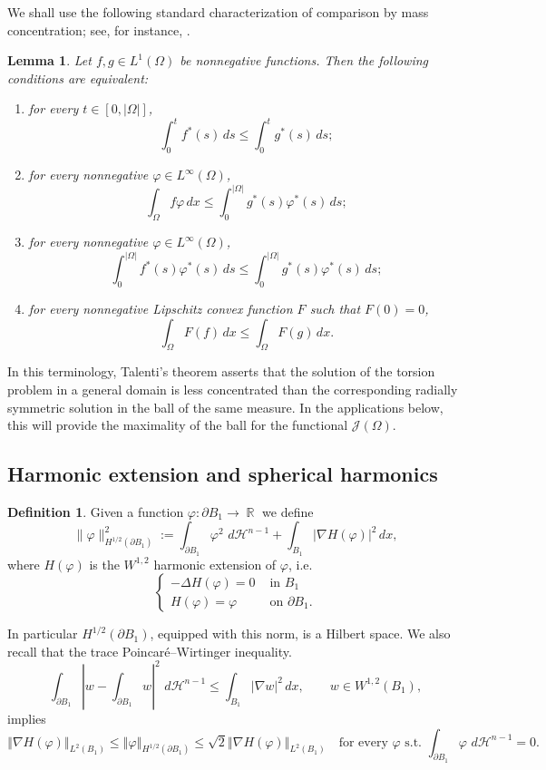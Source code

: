 \documentclass[oneside,a4paper,11pt,notitlepage]{article}
\newcommand{\abs}[1]{{\left|#1\right|}}
\newcommand{\norma}[1]{{\left\Vert#1\right\Vert}}
\newcommand{\dH}{\,d\mathcal{H}^{n-1}}
\theoremstyle{definition}
\newtheorem{definizione}{Definition}[section]
\theoremstyle{plain}
\newtheorem{lemma}[theorem]{Lemma}
\theoremstyle{definition}
\DeclareMathOperator{\R}{\mathbb{R}}
\begin{document}
We shall use the following standard characterization of comparison by mass concentration; see, for instance, \cite{ALT}.

\begin{lemma}
Let $f,g\in L^1(\Omega)$ be nonnegative functions. Then the following conditions are equivalent:
\begin{enumerate}
    \item for every $t\in[0,\abs{\Omega}]$,
    \[
        \int_0^t f^\ast(s)\,ds\leq\int_0^t g^\ast(s)\,ds;
    \]
    
    \item for every nonnegative $\varphi\in L^\infty(\Omega)$,
    \[
        \int_\Omega f\varphi\,dx\leq\int_0^{\abs{\Omega}} g^\ast(s)\varphi^\ast(s)\,ds;
    \]
    
    \item for every nonnegative $\varphi\in L^\infty(\Omega)$,
    \[
        \int_0^{\abs{\Omega}} f^\ast(s)\varphi^\ast(s)\,ds\leq\int_0^{\abs{\Omega}} g^\ast(s)\varphi^\ast(s)\,ds;
    \]
    
    \item for every nonnegative Lipschitz convex function $F$ such that $F(0)=0$,
    \[
        \int_\Omega F(f)\,dx\leq\int_\Omega F(g)\,dx.
    \]
\end{enumerate}
\end{lemma}
In this terminology, Talenti's theorem asserts that the solution of the torsion problem in a general domain is less concentrated than the corresponding radially symmetric solution in the ball of the same measure. In the applications below, this will provide the maximality of the ball for the functional $\mathcal{J}(\Omega)$.
\subsection{Harmonic extension and spherical harmonics}
\begin{definizione}
Given a function $\varphi:\partial B_1\to \R$ we define
\[
\|\varphi\|_{H^{1/2}(\partial B_1)}^2:=\int_{\partial B_1} \varphi^2 \,\dH+\int_{B_1} |\nabla H(\varphi)|^2\,dx,
\]
where $H(\varphi)$ is the $W^{1,2}$ harmonic extension of $\varphi$, i.e.
\[
    \begin{cases}
        -\Delta H(\varphi)=0 & \text{ in } B_1\\
        H(\varphi)=\varphi & \text{ on } \partial B_1.
    \end{cases}
\]
\end{definizione}
In particular $H^{1/2}(\partial B_1)$, equipped with this norm, is a Hilbert space. We also recall that the trace Poincaré--Wirtinger inequality.
\[
\int_{\partial B_1}\abs{w-\int_{\partial B_1}w}^2\,\dH\leq\int_{B_1} \abs{\nabla w}^2\,dx,\qquad w\in W^{1,2}(B_1),
\]
implies
\[
\norma{\nabla H(\varphi)}_{L^2(B_1)}\leq\norma{\varphi}_{H^{1/2}(\partial B_1)}\leq\sqrt{2}\norma{\nabla H(\varphi)}_{L^2(B_1)}\quad\text{for every } \varphi \text{ s.t. } \int_{\partial B_1}\varphi\,\dH=0.
\]
\end{document}
